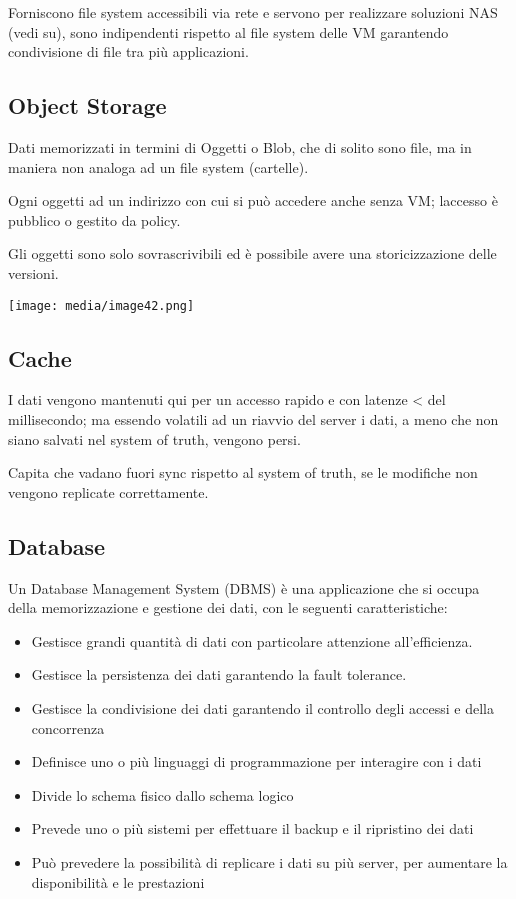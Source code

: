 Forniscono file system accessibili via rete e servono per realizzare
soluzioni NAS (vedi su), sono indipendenti rispetto al file system delle
VM garantendo condivisione di file tra più applicazioni.

\subsection{Object Storage}\label{object-storage}

Dati memorizzati in termini di Oggetti o Blob, che di solito sono file,
ma in maniera non analoga ad un file system (cartelle).

Ogni oggetti ad un indirizzo con cui si può accedere anche senza VM;
l\textquotesingle accesso è pubblico o gestito da policy.

Gli oggetti sono solo sovrascrivibili ed è possibile avere una
storicizzazione delle versioni.

\texttt{[image: media/image42.png]}

\subsection{Cache}\label{cache}

I dati vengono mantenuti qui per un accesso rapido e con latenze
\textless{} del millisecondo; ma essendo volatili ad un riavvio del
server i dati, a meno che non siano salvati nel system of truth, vengono
persi.

Capita che vadano fuori sync rispetto al system of truth, se le
modifiche non vengono replicate correttamente.

\subsection{Database}\label{database}

Un Database Management System (DBMS) è una applicazione che si occupa
della memorizzazione e gestione dei dati, con le seguenti
caratteristiche:

\begin{itemize}
\item
  Gestisce grandi quantità di dati con particolare attenzione
  all'efficienza.
\item
  Gestisce la persistenza dei dati garantendo la fault tolerance.
\item
  Gestisce la condivisione dei dati garantendo il controllo degli
  accessi e della concorrenza
\item
  Definisce uno o più linguaggi di programmazione per interagire con i
  dati
\item
  Divide lo schema fisico dallo schema logico
\item
  Prevede uno o più sistemi per effettuare il backup e il ripristino dei
  dati
\item
  Può prevedere la possibilità di replicare i dati su più server, per
  aumentare la disponibilità e le prestazioni
\end{itemize}


